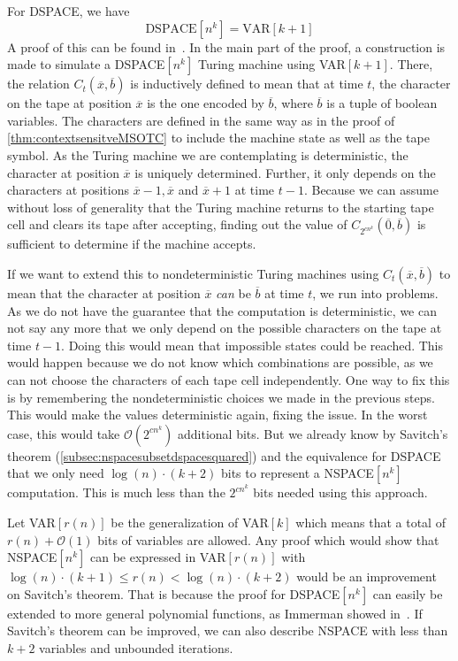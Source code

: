 For DSPACE, we have
\[
    \text{DSPACE}[n^k] = \text{VAR}[k + 1]
\]
A proof of this can be found in~\cite{descriptive-complexity}.
In the main part of the proof, a construction is made to simulate a DSPACE$[n^k]$ Turing machine using VAR$[k + 1]$.
There, the relation $C_{t}(\overline{x}, \overline{b})$ is inductively defined to mean that at time $t$, the character on the tape at position $\overline{x}$ is the one encoded by $\overline{b}$, where $\overline{b}$ is a tuple of boolean variables.
The characters are defined in the same way as in the proof of \cref{thm:contextsensitveMSOTC} to include the machine state as well as the tape symbol.
As the Turing machine we are contemplating is deterministic, the character at position $\overline{x}$ is uniquely determined.
Further, it only depends on the characters at positions $\overline{x} - 1, \overline{x}$ and $\overline{x} + 1$ at time $t - 1$.
Because we can assume without loss of generality that the Turing machine returns to the starting tape cell and clears its tape after accepting, finding out the value of $C_{2^{cn^k}}(\overline{0}, \overline{b})$ is sufficient to determine if the machine accepts.

If we want to extend this to nondeterministic Turing machines using $C_{t}(\overline{x}, \overline{b})$ to mean that the character at position $\overline{x}$ \emph{can} be $\overline{b}$ at time $t$, we run into problems.
As we do not have the guarantee that the computation is deterministic, we can not say any more that we only depend on the possible characters on the tape at time $t - 1$.
Doing this would mean that impossible states could be reached.
This would happen because we do not know which combinations are possible, as we can not choose the characters of each tape cell independently.
One way to fix this is by remembering the nondeterministic choices we made in the previous steps.
This would make the values deterministic again, fixing the issue.
In the worst case, this would take $\mathcal{O}(2^{cn^k})$ additional bits.
But we already know by Savitch's theorem (\cref{subsec:nspacesubsetdspacesquared}) and the equivalence for DSPACE that we only need $\log(n) \cdot (k + 2)$ bits to represent a NSPACE$[n^k]$ computation.
This is much less than the $2^{cn^k}$ bits needed using this approach.

Let VAR$[r(n)]$ be the generalization of VAR$[k]$ which means that a total of $r(n) + \mathcal{O}(1)$ bits of variables are allowed.
Any proof which would show that NSPACE$[n^k]$ can be expressed in VAR$[r(n)]$ with $\log(n) \cdot (k + 1) \leq r(n) < \log(n) \cdot (k + 2)$ would be an improvement on Savitch's theorem.
That is because the proof for DSPACE$[n^k]$ can easily be extended to more general polynomial functions, as Immerman showed in~\cite{Immerman1999}.
If Savitch's theorem can be improved, we can also describe NSPACE with less than $k + 2$ variables and unbounded iterations.


